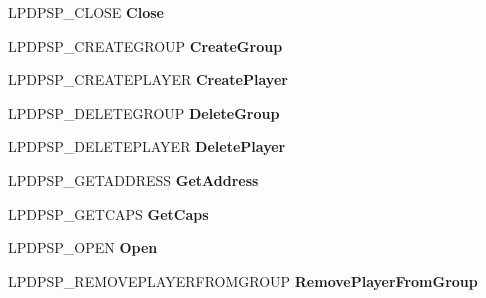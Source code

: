 \begin{DoxyCompactItemize}
L\+P\+D\+P\+S\+P\+\_\+\+C\+L\+O\+SE {\bfseries Close}
\item 
\mbox{\label{structtag_d_p_s_p___s_p_c_a_l_l_b_a_c_k_s_ac7a0bef74b1e7d65789a664a19657c25}} 
L\+P\+D\+P\+S\+P\+\_\+\+C\+R\+E\+A\+T\+E\+G\+R\+O\+UP {\bfseries Create\+Group}
\item 
\mbox{\label{structtag_d_p_s_p___s_p_c_a_l_l_b_a_c_k_s_ad5fc05034c2bbb69f925d9dcf8fcda5c}} 
L\+P\+D\+P\+S\+P\+\_\+\+C\+R\+E\+A\+T\+E\+P\+L\+A\+Y\+ER {\bfseries Create\+Player}
\item 
\mbox{\label{structtag_d_p_s_p___s_p_c_a_l_l_b_a_c_k_s_a3f2a3db25cd3bdcd9121b26097590651}} 
L\+P\+D\+P\+S\+P\+\_\+\+D\+E\+L\+E\+T\+E\+G\+R\+O\+UP {\bfseries Delete\+Group}
\item 
\mbox{\label{structtag_d_p_s_p___s_p_c_a_l_l_b_a_c_k_s_aef2232765d7435b3c727d35a35268b69}} 
L\+P\+D\+P\+S\+P\+\_\+\+D\+E\+L\+E\+T\+E\+P\+L\+A\+Y\+ER {\bfseries Delete\+Player}
\item 
\mbox{\label{structtag_d_p_s_p___s_p_c_a_l_l_b_a_c_k_s_a02cf38068c797d0ea0fb1ae742739d81}} 
L\+P\+D\+P\+S\+P\+\_\+\+G\+E\+T\+A\+D\+D\+R\+E\+SS {\bfseries Get\+Address}
\item 
\mbox{\label{structtag_d_p_s_p___s_p_c_a_l_l_b_a_c_k_s_af252135eeb735a663f3b8f57af55f6d7}} 
L\+P\+D\+P\+S\+P\+\_\+\+G\+E\+T\+C\+A\+PS {\bfseries Get\+Caps}
\item 
\mbox{\label{structtag_d_p_s_p___s_p_c_a_l_l_b_a_c_k_s_a807b4d951bc856ac1f7672cfc333fec3}} 
L\+P\+D\+P\+S\+P\+\_\+\+O\+P\+EN {\bfseries Open}
\item 
\mbox{\label{structtag_d_p_s_p___s_p_c_a_l_l_b_a_c_k_s_a9711f30545304499d16e9080a0c38728}} 
L\+P\+D\+P\+S\+P\+\_\+\+R\+E\+M\+O\+V\+E\+P\+L\+A\+Y\+E\+R\+F\+R\+O\+M\+G\+R\+O\+UP {\bfseries Remove\+Player\+From\+Group}
\item 
\mbox{\label{structtag_d_p_s_p___s_p_c_a_l_l_b_a_c_k_s_ac68daa7e2bcf24fc21dea9cab4ead39f}} 

\end{DoxyCompactItemize}

